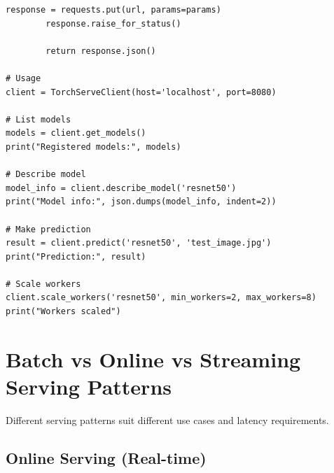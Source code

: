 \begin{lstlisting}[style=python, caption=TorchServe client]
        response = requests.put(url, params=params)
        response.raise_for_status()

        return response.json()

# Usage
client = TorchServeClient(host='localhost', port=8080)

# List models
models = client.get_models()
print("Registered models:", models)

# Describe model
model_info = client.describe_model('resnet50')
print("Model info:", json.dumps(model_info, indent=2))

# Make prediction
result = client.predict('resnet50', 'test_image.jpg')
print("Prediction:", result)

# Scale workers
client.scale_workers('resnet50', min_workers=2, max_workers=8)
print("Workers scaled")
\end{lstlisting}

\section{Batch vs Online vs Streaming Serving Patterns}

Different serving patterns suit different use cases and latency requirements.

\subsection{Online Serving (Real-time)}

